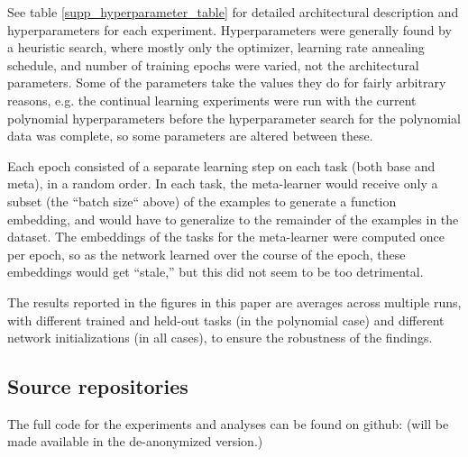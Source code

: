 See table \ref{supp_hyperparameter_table} for detailed architectural description and hyperparameters for each experiment. Hyperparameters were generally found by a heuristic search, where mostly only the optimizer, learning rate annealing schedule, and number of training epochs were varied, not the architectural parameters. Some of the parameters take the values they do for fairly arbitrary reasons, e.g. the continual learning experiments were run with the current polynomial hyperparameters before the hyperparameter search for the polynomial data was complete, so some parameters are altered between these. \par
Each epoch consisted of a separate learning step on each task (both base and meta), in a random order. In each task, the meta-learner would receive only a subset (the ``batch size`` above) of the examples to generate a function embedding, and would have to generalize to the remainder of the examples in the dataset. The embeddings of the tasks for the meta-learner were computed once per epoch, so as the network learned over the course of the epoch, these embeddings would get ``stale,'' but this did not seem to be too detrimental. \par 
The results reported in the figures in this paper are averages across multiple runs, with different trained and held-out tasks (in the polynomial case) and different network initializations (in all cases), to ensure the robustness of the findings. \par 

\subsection{Source repositories}
The full code for the experiments and analyses can be found on github:
(will be made available in the de-anonymized version.)

